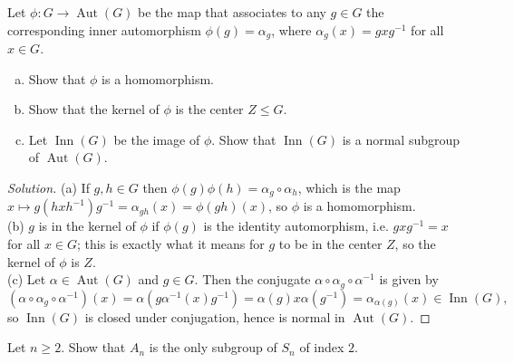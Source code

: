 \documentclass[10pt]{article}
\providecommand{\ii}{\item}
\providecommand{\inv}{^{-1}}
\newenvironment{soln}{\begin{proof}[Solution]}{\end{proof}}
\providecommand{\aut}{\operatorname{Aut}}
\begin{document}
\pagebreak

\begin{problem}
    Let $\phi\colon G\to\aut(G)$ be the map that associates to any $g\in G$
    the corresponding inner automorphism $\phi(g) = \alpha_g$,
    where $\alpha_g(x) = gxg\inv$ for all $x\in G$.
    \begin{enumerate}[(a)]
        \ii Show that $\phi$ is a homomorphism.
	\ii Show that the kernel of $\phi$ is the center $Z\le G$.
	\ii Let $\operatorname{Inn}(G)$ be the image of $\phi$.
	Show that $\operatorname{Inn}(G)$ is a normal subgroup of $\aut(G)$.
    \end{enumerate}
\end{problem}

\begin{soln}
    (a) If $g,h\in G$ then $\phi(g)\phi(h) = \alpha_g\circ\alpha_h$,
    which is the map $x\mapsto g(hxh\inv)g\inv = \alpha_{gh}(x)
    = \phi(gh)(x)$, so $\phi$ is a homomorphism.
    \\

    (b) $g$ is in the kernel of $\phi$ if $\phi(g)$ is the identity automorphism,
    i.e. $gxg\inv = x$ for all $x\in G$; this is exactly what it means
    for $g$ to be in the center $Z$, so the kernel of $\phi$ is $Z$.
    \\

    (c) Let $\alpha\in\aut(G)$ and $g\in G$. Then the conjugate
    $\alpha\circ\alpha_g\circ\alpha\inv$ is given by
    \begin{equation*}
	(\alpha\circ\alpha_g\circ\alpha\inv)(x) =
	\alpha(g\alpha\inv(x)g\inv) = \alpha(g)x\alpha(g\inv)
	= \alpha_{\alpha(g)}(x)\in\operatorname{Inn}(G),
    \end{equation*}
    so $\operatorname{Inn}(G)$ is closed under conjugation,
    hence is normal in $\aut(G)$.
\end{soln}

\begin{problem}
    Let $n\ge 2$. Show that $A_n$ is the only subgroup of $S_n$ of index $2$.
\end{problem}
\end{document}
